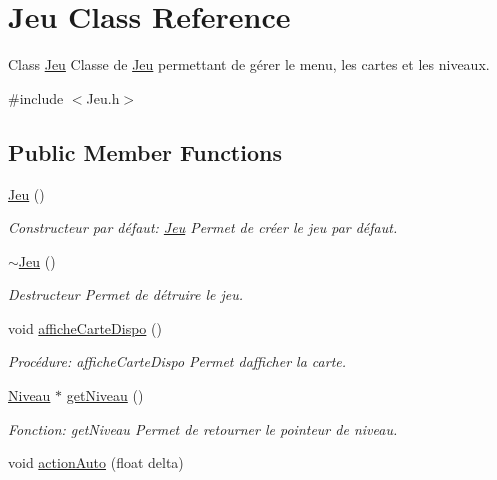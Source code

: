 \hypertarget{classJeu}{}\section{Jeu Class Reference}
\label{classJeu}


Class \hyperlink{classJeu}{Jeu} Classe de \hyperlink{classJeu}{Jeu} permettant de gérer le menu, les cartes et les niveaux.  




{\ttfamily \#include $<$Jeu.\+h$>$}

\subsection*{Public Member Functions}
\begin{DoxyCompactItemize}
\item 
\hyperlink{classJeu_acc5795ee00edf75516d3dfe65be3e6d6}{Jeu} ()
\begin{DoxyCompactList}\small\item\em Constructeur par défaut\+: \hyperlink{classJeu}{Jeu} Permet de créer le jeu par défaut. \end{DoxyCompactList}\item 
\mbox{\label{classJeu_a9cd19e73df169d7f09397be61ba8548c}} 
\hyperlink{classJeu_a9cd19e73df169d7f09397be61ba8548c}{$\sim$\+Jeu} ()
\begin{DoxyCompactList}\small\item\em Destructeur Permet de détruire le jeu. \end{DoxyCompactList}\item 
void \hyperlink{classJeu_a4f8c73b225819fb5a6ba342adc2f1fa4}{affiche\+Carte\+Dispo} ()
\begin{DoxyCompactList}\small\item\em Procédure\+: affiche\+Carte\+Dispo Permet d\textquotesingle{}afficher la carte. \end{DoxyCompactList}\item 
\hyperlink{classNiveau}{Niveau} $\ast$ \hyperlink{classJeu_a71bf0b5329ade330d95318b50d1e2f12}{get\+Niveau} ()
\begin{DoxyCompactList}\small\item\em Fonction\+: get\+Niveau Permet de retourner le pointeur de niveau. \end{DoxyCompactList}\item 
void \hyperlink{classJeu_a8d2a0773d8edcb42d5e055785ad4b71a}{action\+Auto} (float delta)

\end{DoxyCompactItemize}
